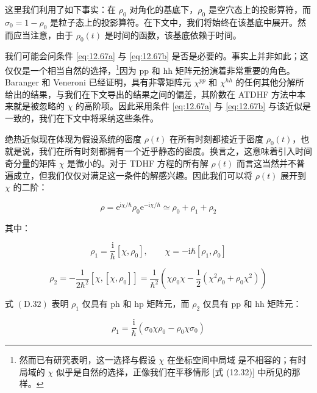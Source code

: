 这里我们利用了如下事实：在 $\rho_{0}$ 对角化的基底下，$\rho_{0}$ 是空穴态上的投影算符，而 $\sigma_{0}=1-\rho_{0}$
是粒子态上的投影算符。在下文中，我们将始终在该基底中展开。然而应当注意，由于 $\rho_{0}(t)$ 是时间的函数，该基底依赖于时间。

我们可能会问条件 \ref{eq:12.67a} 与 \ref{eq:12.67b} 是否是必要的。事实上并非如此；这仅仅是一个相当自然的选择，\footnote{然而已有研究表明，这一选择与假设 $\chi$ 在坐标空间中局域 \cite{BQ78} 是不相容的；有时局域的 $\chi$
似乎是自然的选择，正像我们在平移情形 {[}式 (12.32){]} 中所见的那样。}因为 pp 和 hh 矩阵元扮演着非常重要的角色。Baranger 和 Veneroni \cite{BV78} 已经证明，具有非零矩阵元
$\chi^{pp}$ 和 $\chi^{hh}$ 的任何其他分解所给出的结果，与我们在下文导出的结果之间的偏差，其阶数在 ATDHF
方法中本来就是被忽略的 $\chi$ 的高阶项。因此采用条件 \ref{eq:12.67a} 与 \ref{eq:12.67b}
与该近似是一致的，我们在下文中将采纳这些条件。

绝热近似现在体现为假设系统的密度 $\rho(t)$ 在所有时刻都接近于密度 $\rho_{0}(t)$，也就是说，我们在所有时刻都拥有一个近乎静态的密度。换言之，这意味着引入时间奇分量的矩阵
$\chi$ 是微小的。对于 TDHF 方程的所有解 $\rho(t)$ 而言这当然并不普遍成立，但我们仅仅对满足这一条件的解感兴趣。因此我们可以将
$\rho(t)$ 展开到 $\chi$ 的二阶：

\begin{equation}
\rho=\mathrm{e}^{\mathrm{i}\chi/\hbar}\rho_{0}\mathrm{e}^{-\mathrm{i}\chi/\hbar}\simeq\rho_{0}+\rho_{1}+\rho_{2}\label{eq:12.68}
\end{equation}

其中：

\begin{equation}
\rho_{1}=\frac{\mathrm{i}}{\hbar}[\chi,\rho_{0}],\qquad\chi=-\mathrm{i}\hbar[\rho_{1},\rho_{0}]\label{eq:12.69}
\end{equation}

\begin{equation}
\rho_{2}=-\frac{1}{2\hbar^{2}}[\chi,[\chi,\rho_{0}]]=\frac{1}{\hbar^{2}}\left(\chi\rho_{0}\chi-\frac{1}{2}(\chi^{2}\rho_{0}+\rho_{0}\chi^{2})\right)\label{eq:12.70}
\end{equation}

式 $(\text{D}.32)$ 表明 $\rho_{1}$ 仅具有 ph 和 hp 矩阵元，而 $\rho_{2}$ 仅具有
pp 和 hh 矩阵元：

\begin{equation}
\rho_{1}=\frac{\mathrm{i}}{\hbar}(\sigma_{0}\chi\rho_{0}-\rho_{0}\chi\sigma_{0})\label{eq:12.71}
\end{equation}


